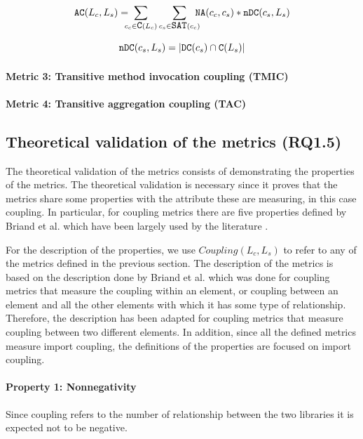 \begin{equation*}
  \verb|AC|(L_c,L_s) = \!\!\!\!\sum_{c_c \in \verb|C|(L_c)} \sum_{c_s \in \verb|SAT|(c_c)} \!\!\!\!\verb|NA|(c_c, c_s)*\verb|nDC|(c_s, L_s)
\end{equation*}

\begin{equation*}
    \verb|nDC|(c_s, L_s) = |\verb|DC|(c_s) \cap \verb|C|(L_s)|
\end{equation*}

\paragraph{Metric 3: Transitive method invocation coupling (TMIC)}

\paragraph{Metric 4: Transitive aggregation coupling (TAC)}


\subsection{Theoretical validation of the metrics (RQ1.5)}
The theoretical validation of the metrics consists of demonstrating the properties of the metrics. The theoretical validation is necessary since it proves that the metrics share some properties with the attribute these are measuring, in this case coupling. In particular, for coupling metrics there are five properties defined by Briand et al. \cite{briand1996property} which have been largely used by the literature \cite{poshyvanyk2006conceptual, allen1999measuring, zhao2004measuring}.

For the description of the properties, we use $Coupling(L_c, L_s)$ to refer to any of the metrics defined in the previous section. The description of the metrics is based on the description done by Briand et al. which was done for coupling metrics that measure the coupling within an element, or coupling between an element and all the other elements with which it has some type of relationship. Therefore, the description has been adapted for coupling metrics that measure coupling between two different elements. In addition, since all the defined metrics measure import coupling, the definitions of the properties are focused on import coupling.

\paragraph{Property 1: Nonnegativity}
Since coupling refers to the number of relationship between the two libraries it is expected not to be negative.

